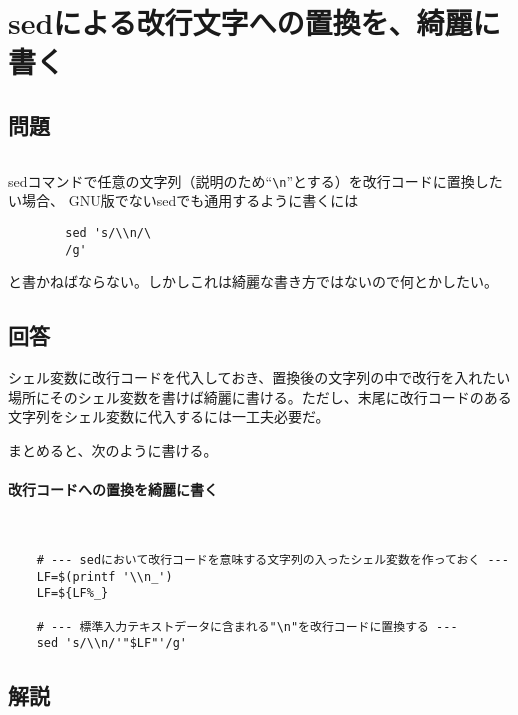 \section{sedによる改行文字への置換を、綺麗に書く}
\label{recipe:sed_LF}

\subsection*{問題}
\noindent
$\!\!\!\!\!$
\begin{grshfboxit}{160.0mm}
	sedコマンドで任意の文字列（説明のため``\verb|\n|''とする）を改行コードに置換したい場合、
	GNU版でないsedでも通用するように書くには
	\begin{verbatim}
		sed 's/\\n/\
		/g'
	\end{verbatim}
	と書かねばならない。しかしこれは綺麗な書き方ではないので何とかしたい。
\end{grshfboxit}

\subsection*{回答}
シェル変数に改行コードを代入しておき、置換後の文字列の中で改行を入れたい場所にそのシェル変数を書けば綺麗に書ける。ただし、末尾に改行コードのある文字列をシェル変数に代入するには一工夫必要だ。

まとめると、次のように書ける。
\paragraph{改行コードへの置換を綺麗に書く} 　\\
\begin{frameboxit}{160.0mm}
\begin{verbatim}
	# --- sedにおいて改行コードを意味する文字列の入ったシェル変数を作っておく ---
	LF=$(printf '\\n_')
	LF=${LF%_}

	# --- 標準入力テキストデータに含まれる"\n"を改行コードに置換する ---
	sed 's/\\n/'"$LF"'/g'
\end{verbatim}
\end{frameboxit}

\subsection*{解説}

